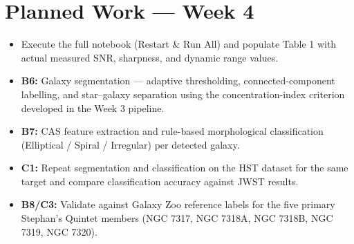 \documentclass[11pt]{article}
\begin{document}
\section{Planned Work --- Week 4}
\begin{itemize}
    \item Execute the full notebook (Restart \& Run All) and populate Table 1 with actual measured SNR, sharpness, and dynamic range values.
    \item \textbf{B6:} Galaxy segmentation --- adaptive thresholding, connected-component labelling, and star--galaxy separation using the concentration-index criterion developed in the Week 3 pipeline.
    \item \textbf{B7:} CAS feature extraction and rule-based morphological classification (Elliptical / Spiral / Irregular) per detected galaxy.
    \item \textbf{C1:} Repeat segmentation and classification on the HST dataset for the same target and compare classification accuracy against JWST results.
    \item \textbf{B8/C3:} Validate against Galaxy Zoo reference labels for the five primary Stephan's Quintet members (NGC 7317, NGC 7318A, NGC 7318B, NGC 7319, NGC 7320).
\end{itemize}
\end{document}
